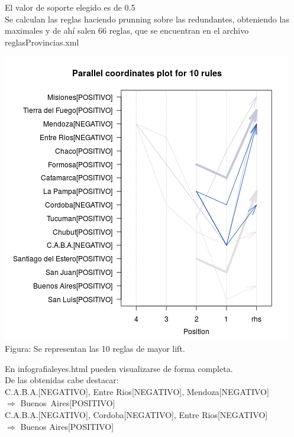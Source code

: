 \documentclass{endm}
\begin{document}
El valor de soporte elegido es de 0.5\\

Se calculan las reglas haciendo prunning sobre las redundantes, obteniendo las maximales y de ahí salen 66 reglas, que se encuentran en el archivo reglasProvincias.xml \\

\begin{center}
\includegraphics[scale=0.4]{graficos/paracoordProvincias.png} \\
\scriptsize{Figura: Se representan las 10 reglas de mayor lift.}
\end{center} 

En infografialeyes.html pueden visualizarse de forma completa. \\

De las obtenidas cabe destacar: \\

C.A.B.A.[NEGATIVO], Entre Rios[NEGATIVO], Mendoza[NEGATIVO]\\ $\Longrightarrow$ Buenos\ Aires[POSITIVO] \\

{C.A.B.A.[NEGATIVO],                            Cordoba[NEGATIVO],                              Entre Rios[NEGATIVO]}\\ $\Longrightarrow$ {Buenos Aires[POSITIVO]}  \\
\end{document}
